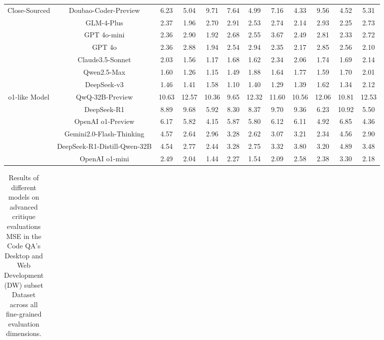 \documentclass[11pt, a4paper, logo, copyright, nonumbering, amsart]{map}
\begin{document}
\begin{CJK*}{UTF8}{gbsn}
\begin{table*}[h!]
\begin{adjustbox}{width=\textwidth}
\begin{tabular}{c|c|cccccccccc}
    \midrule
    \multirow{7}{*}{Close-Sourced} 
    & Doubao-Coder-Preview & 6.23 & 5.04 & 9.71 & 7.64 & 4.99 & 7.16 & 4.33 & 9.56 & 4.52 & 5.31 \\
    & GLM-4-Plus & 2.37 & 1.96 & 2.70 & 2.91 & 2.53 & 2.74 & 2.14 & 2.93 & 2.25 & 2.73 \\
    & GPT 4o-mini & 2.36 & 2.90 & 1.92 & 2.68 & 2.55 & 3.67 & 2.49 & 2.81 & 2.33 & 2.72 \\
    & GPT 4o & 2.36 & 2.88 & 1.94 & 2.54 & 2.94 & 2.35 & 2.17 & 2.85 & 2.56 & 2.10 \\
    & Claude3.5-Sonnet & 2.03 & 1.56 & 1.17 & 1.68 & 1.62 & 2.34 & 2.06 & 1.74 & 1.69 & 2.14 \\
    & Qwen2.5-Max & 1.60 & 1.26 & 1.15 & 1.49 & 1.88 & 1.64 & 1.77 & 1.59 & 1.70 & 2.01 \\
    & DeepSeek-v3 & 1.46 & 1.41 & 1.58 & 1.10 & 1.40 & 1.29 & 1.39 & 1.62 & 1.34 & 2.12 \\
    
    \midrule
    \multirow{6}{*}{o1-like Model} 
    & QwQ-32B-Preview & 10.63 & 12.57 & 10.36 & 9.65 & 12.32 & 11.60 & 10.56 & 12.06 & 10.81 & 12.53 \\
    & DeepSeek-R1 & 8.89 & 9.68 & 5.92 & 8.30 & 8.37 & 9.70 & 9.36 & 6.23 & 10.92 & 5.50 \\
    & OpenAI o1-Preview & 6.17 & 5.82 & 4.15 & 5.87 & 5.80 & 6.12 & 6.11 & 4.92 & 6.85 & 4.36 \\
    & Gemini2.0-Flash-Thinking & 4.57 & 2.64 & 2.96 & 3.28 & 2.62 & 3.07 & 3.21 & 2.34 & 4.56 & 2.90 \\
    & DeepSeek-R1-Distill-Qwen-32B & 4.54 & 2.77 & 2.44 & 3.28 & 2.75 & 3.32 & 3.80 & 3.20 & 4.89 & 3.48 \\
    & OpenAI o1-mini & 2.49 & 2.04 & 1.44 & 2.27 & 1.54 & 2.09 & 2.58 & 2.38 & 3.30 & 2.18 \\
    \bottomrule
    \end{tabular}
    \end{adjustbox}
\end{table*}

\begin{table*}[h!]
    \centering
    \caption{Results of different models on advanced critique evaluations MSE in the Code QA's Desktop and Web Development (DW) subset Dataset across all fine-grained evaluation dimensions.} \label{table:real_level2_dw_dim}
    \begin{adjustbox}{width=\textwidth}
    \begin{tabular}{c|c|cccccccccc}
    

\end{tabular}
\end{adjustbox}
\end{table*}
\end{CJK*}
\end{document}
